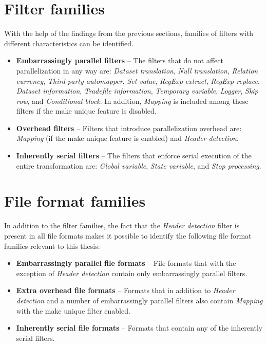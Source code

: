 \section{Filter families}
With the help of the findings from the previous sections, families of filters with different characteristics can be identified.

\begin{itemize}
\item \textbf{Embarrassingly parallel filters} --
The filters that do not affect parallelization in any way are:
\textit{Dataset translation}, \textit{Null translation}, \textit{Relation currency},
\textit{Third party automapper}, \textit{Set value}, \textit{RegExp extract}, \textit{RegExp replace},
\textit{Dataset information}, \textit{Tradefile information}, \textit{Temporary variable}, \textit{Logger}, \textit{Skip row}, and \textit{Conditional block}.
In addition, \textit{Mapping} is included among these filters if the make unique feature is disabled.
\item \textbf{Overhead filters} -- 
Filters that introduce parallelization overhead are: \textit{Mapping} (if the make unique feature is enabled) and \textit{Header detection}.
\item \textbf{Inherently serial filters} --
The filters that enforce serial execution of the entire transformation are: \textit{Global variable}, \textit{State variable}, and \textit{Stop processing}.
\end{itemize}

\section{File format families}
In addition to the filter families, the fact that the \textit{Header detection} filter is present in all file formats makes it possible to identify the following
file format families relevant to this thesis:

\begin{itemize}
\item \textbf{Embarrassingly parallel file formats} --
  File formats that with the exception of \textit{Header detection} contain only embarrassingly parallel filters. 
\item \textbf{Extra overhead file formats} --
  Formats that in addition to \textit{Header detection} and a number of embarrassingly parallel filters also contain \textit{Mapping} with the make unique filter enabled.
\item \textbf{Inherently serial file formats} --
  Formats that contain any of the inherently serial filters.
\end{itemize}

